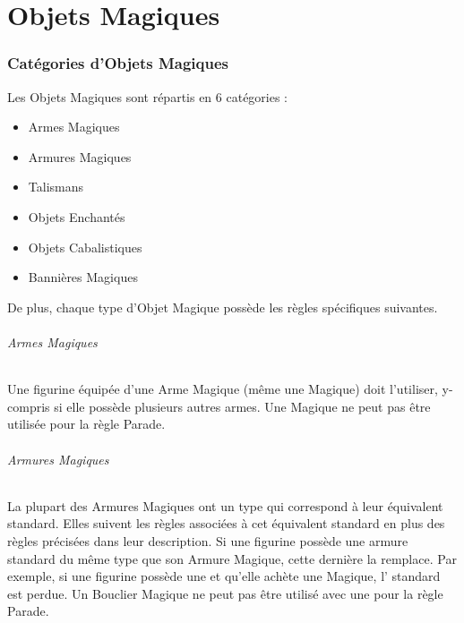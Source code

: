 
\newcommand{\rendingbanner}{Bannière de Rasoirs}
\newcommand{\stalkersstandard}{Étendard du Pisteur}
\newcommand{\bannerofdiscipline}{Bannière de Discipline}
\newcommand{\bannerofspeed}{Bannière de Vitesse}
\newcommand{\aethericon}{Icône d'Æther}
\newcommand{\flamingstandard}{Étendard Flamboyant}
\newcommand{\warstandard}{Étendard de Guerre}
\newcommand{\iconoftherelentlesscompany}{Icône de la Compagnie Implacable}
\newcommand{\gleamingicon}{Icône Étincelante}



\part{Objets Magiques}

\section{Catégories d'Objets Magiques}

Les Objets Magiques sont répartis en 6 catégories :
\begin{itemize}[label={\textbullet}]
\item Armes Magiques
\item Armures Magiques
\item Talismans
\item Objets Enchantés
\item Objets Cabalistiques
\item Bannières Magiques
\end{itemize}

De plus, chaque type d'Objet Magique possède les règles spécifiques suivantes.

\paragraph{Armes Magiques}

Une figurine équipée d'une Arme Magique (même une \hw{} Magique) doit l'utiliser, y-compris si elle possède plusieurs autres armes. Une \hw{} Magique ne peut pas être utilisée pour la règle Parade.

\paragraph{Armures Magiques}

La plupart des Armures Magiques ont un type qui correspond à leur équivalent standard. Elles suivent les règles associées à cet équivalent standard en plus des règles précisées dans leur description. Si une figurine possède une armure standard du même type que son Armure Magique, cette dernière la remplace. Par exemple, si une figurine possède une \ha{} et qu'elle achète une \la{} Magique, l'\ha{} standard est perdue. Un Bouclier Magique ne peut pas être utilisé avec une \hw{} pour la règle Parade.

